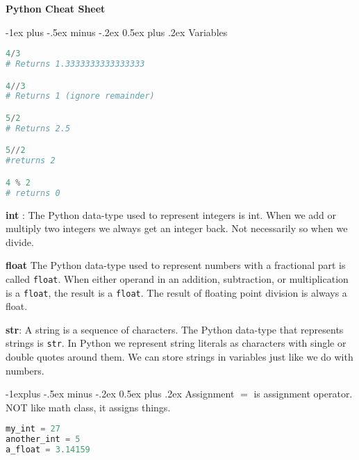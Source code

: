 \documentclass[8pt,landscape]{article}
\makeatletter
\renewcommand{\section}{\@startsection{section}{1}{0mm}%
                                {-1ex plus -.5ex minus -.2ex}%
                                {0.5ex plus .2ex}%
                                {\normalfont\normalsize\bfseries}}
\renewcommand{\subsection}{\@startsection{subsection}{2}{0mm}%
                                {-1explus -.5ex minus -.2ex}%
                                {0.5ex plus .2ex}%
                                {\normalfont\small\bfseries}}
\makeatother
\begin{document}
\raggedright
\footnotesize
\begin{multicols}{3}


\setlength{\premulticols}{1pt}
\setlength{\postmulticols}{1pt}
\setlength{\multicolsep}{1pt}
\setlength{\columnsep}{2pt}

\begin{center}
     \Large{\textbf{Python Cheat Sheet}} \\
\end{center}

\section{Variables}


\begin{lstlisting}[language=Python]
4/3
# Returns 1.3333333333333333

4//3	
# Returns 1 (ignore remainder)

5/2
# Returns 2.5 

5//2
#returns 2

4 % 2
# returns 0
\end{lstlisting}



\textbf{int} : The Python data-type used to represent integers is int. When we add or multiply two integers we always get an integer back. Not necessarily so when we divide.

\textbf{float} The Python data-type used to represent numbers with a fractional part is called \verb|float|. When either operand in an addition, subtraction, or multiplication is a \verb|float|, the result is a \verb|float|. The result of floating point division is always a float.

\textbf{str}: A string is a sequence of characters. The Python data-type that represents strings is \verb|str|. In Python we represent string literals as characters with single or double quotes around them. We can store strings in variables just like we do with numbers.

\subsection{Assignment}
$=$ is assignment operator. NOT like math class, it assigns things. 

\begin{lstlisting}[language=Python]
my_int = 27
another_int = 5
a_float = 3.14159


\end{lstlisting}
\end{multicols}
\end{document}
